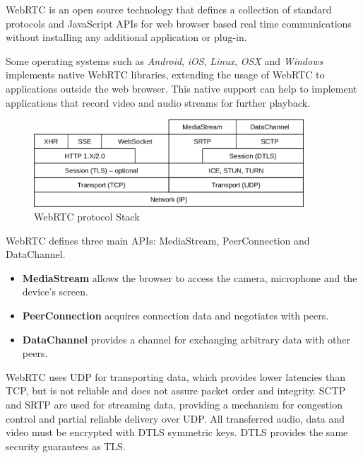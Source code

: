 \ac{WebRTC} is an open source technology that defines a collection of standard protocols and JavaScript \ac{API}s for web browser based real time communications without installing any additional application or plug-in. 

Some operating systems such as \emph{Android}, \emph{iOS}, \emph{Linux}, \emph{OSX} and \emph{Windows} implements native \ac{WebRTC} libraries, extending the usage of \ac{WebRTC} to applications outside the web browser. This native support can help to implement applications that record video and audio streams for further playback.


\begin{figure}[H]
	\centering
	\includegraphics[width=0.9\textwidth]{figures/webrtc_stack.png}
	\caption{WebRTC protocol Stack}
\end{figure}

\ac{WebRTC} defines three main \ac{API}s: MediaStream, PeerConnection and DataChannel. 

\begin{itemize}
  \item \textbf{MediaStream} allows the browser to access the camera, microphone and the device's screen. 

  \item \textbf{PeerConnection} acquires connection data and negotiates with peers.
  \item \textbf{DataChannel} provides a channel for exchanging arbitrary data with other peers.
\end{itemize}

\ac{WebRTC} uses \ac{UDP} for transporting data, which provides lower latencies than \ac{TCP}, but is not reliable and does not assure packet order and integrity. \ac{SCTP} and \ac{SRTP} are used for streaming data, providing a mechanism for congestion control and partial reliable delivery over \ac{UDP}. All transferred audio, data and video must be encrypted with \ac{DTLS} symmetric keys. \ac{DTLS} provides the same security guarantees as \ac{TLS}. 

